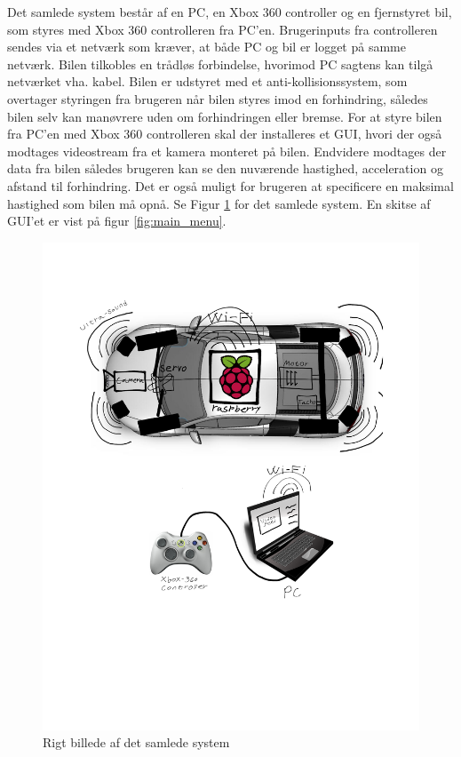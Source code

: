 Det samlede system består af en PC, en Xbox 360 controller og en fjernstyret bil, som styres med Xbox 360 controlleren fra PC'en. Brugerinputs fra controlleren sendes via et netværk som kræver, at både PC og bil er logget på samme netværk. Bilen tilkobles en trådløs forbindelse, hvorimod PC sagtens kan tilgå netværket vha. kabel. Bilen er udstyret med et anti-kollisionssystem, som overtager styringen fra brugeren når bilen styres imod en forhindring, således bilen selv kan manøvrere uden om forhindringen eller bremse. For at styre bilen fra PC'en med Xbox 360 controlleren skal der installeres et GUI, hvori der også modtages videostream fra et kamera monteret på bilen. Endvidere modtages der data fra bilen således brugeren kan se den nuværende hastighed, acceleration og afstand til forhindring. Det er også muligt for brugeren at specificere en maksimal hastighed som bilen må opnå. Se Figur \ref{fig:rigbillede} for det samlede system. En skitse af GUI'et er vist på figur \ref{fig:main_menu}.
\begin{figure}[H]
\centering
\includegraphics[width=\textwidth * 3/4]{../fig/billeder/rigbillede}
\caption{Rigt billede af det samlede system}
\label{fig:rigbillede}
\end{figure} 

